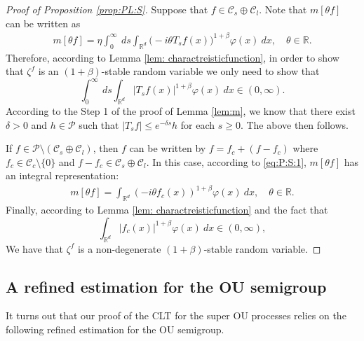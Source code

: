 \documentclass[12pt,a4paper]{amsart}
\theoremstyle{plain}
\theoremstyle{definition}
\numberwithin{equation}{section}
\begin{document}
\begin{proof}[Proof of Proposition \ref{prop:PL:S}]
	Suppose that $f\in \mathcal C_s \oplus \mathcal C_l$.
Note that $m[\theta f]$ can be written as
  \begin{align}
    \label{eq:PL:S:1}
    m[\theta f]
    = \eta \int_0^{\infty}~ds\int_{\mathbb R^d} \big(-i\theta T_s f(x)\big)^{1+\beta} \varphi(x)~dx,
    \quad \theta \in \mathbb R.
  \end{align}
	Therefore, according to Lemma \ref{lem: charactreisticfunction}, in order to show that $\zeta^f$ is an $(1+\beta)$-stable random variable we only need to show that
\[
\int_0^{\infty}~ds\int_{\mathbb R^d} | T_{s} f(x)|^{1+\beta} \varphi(x)~dx
    \in (0, \infty).
    \]
  According to the Step 1 of the proof of Lemma \ref{lem:m},
 we know that there exist $\delta> 0$ and $h \in \mathcal P$ such that $|T_sf| \leq e^{- \delta s} h$ for each $s\geq 0$.
  The above then follows.

 If $f \in \mathcal P \setminus (\mathcal C_s \oplus \mathcal C_l)$,
  then $f$ can be written by $f = f_c +(f - f_c)$ where $f_c \in \mathcal C_c\setminus\{0\}$ and $f - f_c \in \mathcal C_s \oplus \mathcal C_l$.
 In this case, according to \eqref{eq:P:S:1}, $m[\theta f]$ has an integral representation:
  \begin{align}
  \label{eq:PL:S:2}
  m[\theta f]
  = \int_{\mathbb R^d} (-i\theta f_c(x))^{1+\beta} \varphi(x) ~dx,
  \quad \theta \in \mathbb R.
  \end{align}
  Finally, according to Lemma \ref{lem: charactreisticfunction} and the fact that
  \begin{equation}
    \int_{\mathbb R^d} | f_c(x)|^{1+\beta} \varphi(x)~dx
    \in (0, \infty),
  \end{equation}
We have that $\zeta^f$ is a non-degenerate $(1+\beta)$-stable random variable.
\end{proof}


\subsection{A refined estimation for the OU semigroup}
It turns out that our proof of the CLT for the super OU processes relies on the following refined estimation for the OU semigroup.
\end{document}
